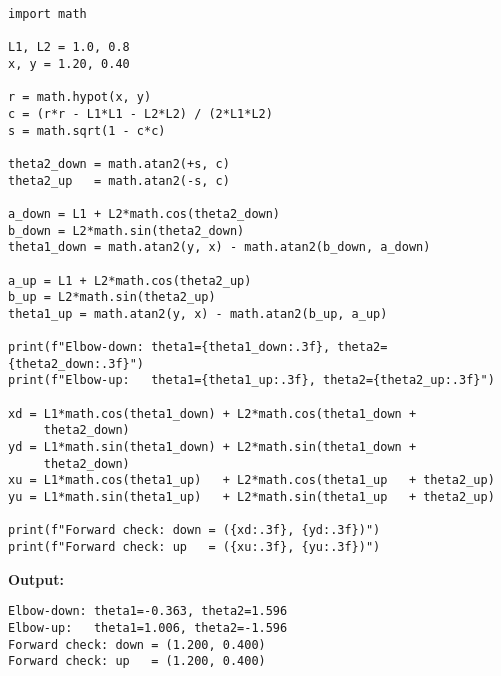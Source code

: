 \documentclass[11pt]{article}
\begin{document}
\begin{lstlisting}[caption={Python Implementation of 2R Planar Arm Inverse Kinematics}]
import math

L1, L2 = 1.0, 0.8
x, y = 1.20, 0.40

r = math.hypot(x, y)
c = (r*r - L1*L1 - L2*L2) / (2*L1*L2)
s = math.sqrt(1 - c*c)

theta2_down = math.atan2(+s, c)
theta2_up   = math.atan2(-s, c)

a_down = L1 + L2*math.cos(theta2_down)
b_down = L2*math.sin(theta2_down)
theta1_down = math.atan2(y, x) - math.atan2(b_down, a_down)

a_up = L1 + L2*math.cos(theta2_up)
b_up = L2*math.sin(theta2_up)
theta1_up = math.atan2(y, x) - math.atan2(b_up, a_up)

print(f"Elbow-down: theta1={theta1_down:.3f}, theta2={theta2_down:.3f}")
print(f"Elbow-up:   theta1={theta1_up:.3f}, theta2={theta2_up:.3f}")

xd = L1*math.cos(theta1_down) + L2*math.cos(theta1_down + 
     theta2_down)
yd = L1*math.sin(theta1_down) + L2*math.sin(theta1_down + 
     theta2_down)
xu = L1*math.cos(theta1_up)   + L2*math.cos(theta1_up   + theta2_up)
yu = L1*math.sin(theta1_up)   + L2*math.sin(theta1_up   + theta2_up)

print(f"Forward check: down = ({xd:.3f}, {yd:.3f})")
print(f"Forward check: up   = ({xu:.3f}, {yu:.3f})")
\end{lstlisting}

\textbf{Output:}
\begin{verbatim}
Elbow-down: theta1=-0.363, theta2=1.596
Elbow-up:   theta1=1.006, theta2=-1.596
Forward check: down = (1.200, 0.400)
Forward check: up   = (1.200, 0.400)
\end{verbatim}
\end{document}
